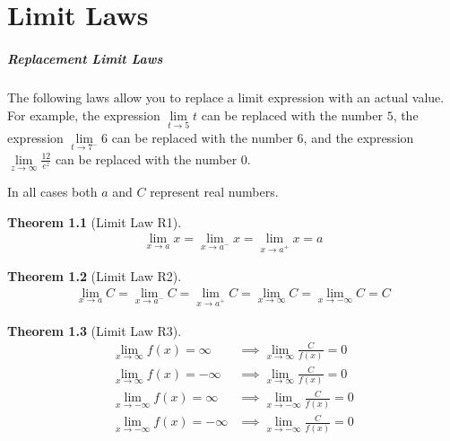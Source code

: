 \documentclass[12pt,]{book}
\theoremstyle{plain}
\newtheorem{theorem}{Theorem}[section]
\theoremstyle{definition}
\theoremstyle{definition}
\theoremstyle{definition}
\theoremstyle{definition}
\theoremstyle{definition}
\numberwithin{equation}{section}
\newcommand{\fe}[2]{#1\mathopen{}\left(#2\right)\mathclose{}}
\begin{document}
\chapter[{Limit Laws}]{Limit Laws}\label{appendix-limit-laws}
\typeout{************************************************}
\typeout{************************************************}
\paragraph[{Replacement Limit Laws}]{Replacement Limit Laws}\hypertarget{paragraphs-20}{}
The following laws allow you to replace a limit expression with an actual value.  For example, the expression \(\lim\limits_{t\to5}t\) can be replaced with the number \(5\), the expression \(\lim\limits_{t\to7^{-}}6\) can be replaced with the number \(6\), and the expression \(\lim\limits_{z\to\infty}\frac{12}{e^z}\) can be replaced with the number \(0\).%
\par
In all cases both \(a\) and \(C\) represent real numbers.%
\begin{theorem}[{Limit Law R1}]\label{llr1}
\begin{gather*}
\lim_{x\to a}x=\lim_{x\to a^{-}}x=\lim_{x\to a^{+}}x=a
\end{gather*}%
\end{theorem}
\begin{theorem}[{Limit Law R2}]\label{llr2}
\begin{gather*}
\lim_{x\to a}C=\lim_{x\to a^{-}}C=\lim_{x\to a^{+}}C=\lim_{x\to \infty}C=\lim_{x\to -\infty}C=C
\end{gather*}%
\end{theorem}
\begin{theorem}[{Limit Law R3}]\label{llr3}
\begin{align*}
\lim_{x\to \infty}\fe{f}{x}=\infty&\implies\lim_{x\to \infty}\frac{C}{\fe{f}{x}}=0\\
\lim_{x\to \infty}\fe{f}{x}=-\infty&\implies\lim_{x\to \infty}\frac{C}{\fe{f}{x}}=0\\
\lim_{x\to -\infty}\fe{f}{x}=\infty&\implies\lim_{x\to -\infty}\frac{C}{\fe{f}{x}}=0\\
\lim_{x\to -\infty}\fe{f}{x}=-\infty&\implies\lim_{x\to -\infty}\frac{C}{\fe{f}{x}}=0
\end{align*}%
\end{theorem}
\typeout{************************************************}
\typeout{************************************************}
\end{document}
